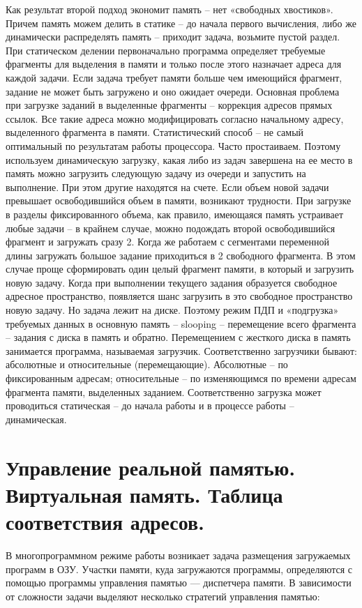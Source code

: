 \documentclass[unicode, 12pt, a4paper, oneside]{article}
\begin{document}
Как результат второй подход экономит память – нет «свободных хвостиков».
Причем память можем делить в статике – до начала первого вычисления, либо же динамически распределять память – приходит задача, возьмите пустой раздел. При статическом делении первоначально программа определяет требуемые фрагменты для выделения в памяти и только после этого назначает адреса для каждой задачи. Если задача требует памяти больше чем имеющийся фрагмент, задание не может быть загружено и оно ожидает очереди.
Основная проблема при загрузке заданий в выделенные фрагменты – коррекция адресов прямых ссылок. Все такие адреса можно модифицировать согласно начальному адресу, выделенного фрагмента в памяти.
Статистический способ – не самый оптимальный по результатам работы процессора. Часто простаиваем. Поэтому используем динамическую загрузку, какая либо из задач завершена на ее место в память можно загрузить следующую задачу из очереди и запустить на выполнение. При этом другие находятся на счете. Если объем новой задачи превышает освободившийся объем в памяти, возникают трудности. При загрузке в разделы фиксированного объема, как правило, имеющаяся память устраивает любые задачи – в крайнем случае, можно подождать второй освободившийся фрагмент и загружать сразу 2. Когда же работаем с сегментами переменной длины загружать большое задание приходиться в 2 свободного фрагмента.
В этом случае проще сформировать один целый фрагмент памяти, в который и загрузить новую задачу.
Когда при выполнении текущего задания образуется свободное адресное пространство, появляется шанс загрузить в это свободное пространство новую задачу.
Но задача лежит на диске. Поэтому режим ПДП и «подгрузка» требуемых данных в основную память – slooping – перемещение всего фрагмента – задания с диска в память и обратно. Перемещением с жесткого диска в память занимается программа, называемая загрузчик. Соответственно загрузчики бывают: абсолютные и относительные (перемещающие). Абсолютные – по фиксированным адресам; относительные – по изменяющимся по времени адресам фрагмента памяти, выделенных заданием. Соответственно загрузка может проводиться статическая – до начала работы и в процессе работы – динамическая.

\section{Управление реальной памятью. Виртуальная память. Таблица соответствия адресов.}

В многопрограммном режиме работы возникает задача размещения загружаемых программ в ОЗУ.  Участки памяти, куда загружаются программы, определяются с помощью программы управления памятью — диспетчера памяти. В зависимости от сложности задачи выделяют несколько стратегий управления памятью:
\end{document}
